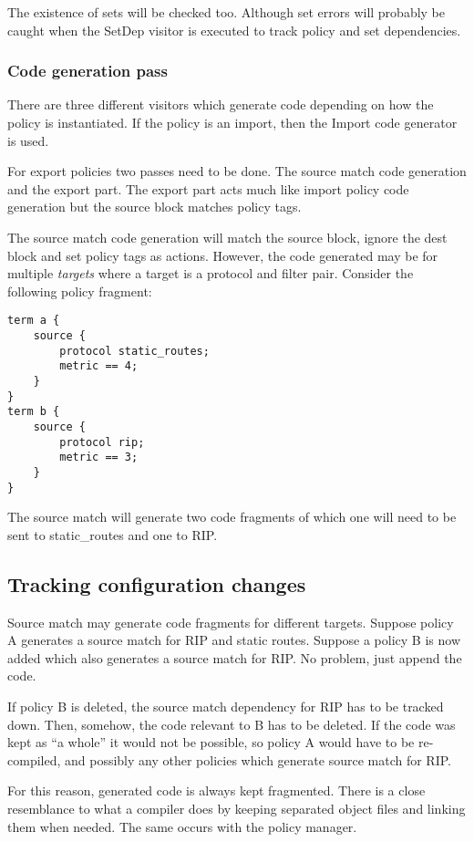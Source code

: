\documentclass{article}
\begin{document}
The existence of sets will be checked too. Although set errors will probably
be caught when the SetDep visitor is executed to track policy and set
dependencies.

\subsubsection{Code generation pass}
There are three different visitors which generate code depending on how the policy
is instantiated. If the policy is an import, then the Import code generator is
used.

For export policies two passes need to be done. The source match code
generation and the export part. The export part acts much like import policy
code generation but the source block matches policy tags.

The source match code generation will match the source block, ignore the dest
block and set policy tags as actions. However, the code generated may be for
multiple {\em targets} where a target is a protocol and filter pair. Consider
the following policy fragment:
\begin{verbatim}
term a {
    source {
        protocol static_routes;
        metric == 4;
    }
}
term b {
    source {
        protocol rip;
        metric == 3;
    }
}    
\end{verbatim}
The source match will generate two code fragments of which one will need to be
sent to static\_routes and one to RIP.


\subsection{Tracking configuration changes}
Source match may generate code fragments for different targets.  Suppose policy
A generates a source match for RIP and static routes. Suppose a policy B is now
added which also generates a source match for RIP. No problem, just append the
code. 

If policy B is deleted, the source match dependency for RIP has to be tracked
down. Then, somehow, the code relevant to B has to be deleted. If the code was
kept as ``a whole'' it would not be possible, so policy A would have to be
re-compiled, and possibly any other policies which generate source match for
RIP.

For this reason, generated code is always kept fragmented. There is a close
resemblance to what a compiler does by keeping separated object files and
linking them when needed. The same occurs with the policy manager.
\end{document}
